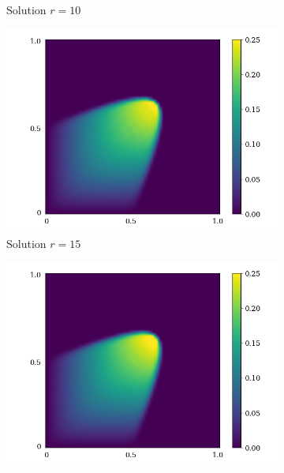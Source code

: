 \begin{figure}[!htb]
\begin{center}
\begin{subfigure}[b]{0.23\textwidth}
\begin{center}
        \end{center}
            \caption{Solution $r = 10$}
        \end{subfigure}
   \begin{subfigure}[b]{0.23\textwidth}
       \begin{center}
        \includegraphics[trim = {0, 0, 3cm, 0}, clip, width=\textwidth]{Pictures/X-rom-LE-SAE-15.png}
       \end{center}
            \caption{Solution $r = 15$}
        \end{subfigure}
   \begin{subfigure}[b]{0.23\textwidth}
       \begin{center}
        \includegraphics[trim = {0, 0, 3cm, 0}, clip, width=\textwidth]{Pictures/X-rom-LE-SAE-20.png}

\end{center}
\end{subfigure}
\end{center}
\end{figure}
